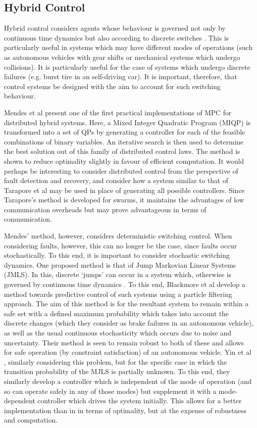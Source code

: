 \documentclass[../sample.tex]{subfiles}
\begin{document}
\subsection{Hybrid Control}

Hybrid control considers agents whose behaviour is governed not only by continuous time dynamics but
also according to discrete switches \cite{Lygeros2004}. This is particularly useful in systems
which may have different modes of operations (such as autonomous vehicles with gear shifts or
mechanical systems which undergo collisions). It is particularly useful for the case of systems
which undergo discrete failures (e.g. burst tire in an self-driving car). It is important,
therefore, that control systems be designed with the aim to account for such switching behaviour. 

Mendes et al \cite{Mendes2017} present one of the first practical implementations of MPC for
distributed hybrid systems. Here, a Mixed Integer Quadratic Program (MIQP) is transformed into a set
of QPs by generating a controller for each of the feasible combinations of binary variables. An
iterative search is then used to determine the best solution out of this family of distributed
control laws. The method is shown to reduce optimality slightly in favour of efficient computation.
It would perhaps be interesting to consider distributed control from the perspective of fault
detection and recovery, and consider how a system similar to that of Tarapore et al may be used in
place of generating all possible controllers. Since Tarapore’s method is developed for swarms, it
maintains the advantages of low communication overheads but may prove advantageous in terms of
communication.

Mendes’ method, however, considers deterministic switching control. When considering faults,
however, this can no longer be the case, since faults occur stochastically. To this end, it is
important to consider stochastic switching dynamics. One proposed method is that of Jump Markovian
Linear Systems (JMLS). In this, discrete ‘jumps’ can occur in a system which, otherwise is governed
by continuous time dynamics \cite{Ma2017}. To this end, Blackmore et al \cite{Blackmore2007} develop
a method towards predictive control of such systems using a particle filtering approach. The aim of
this method is for the resultant system to remain within a safe set with a defined maximum
probability which takes into account the discrete changes (which they consider as brake failures in
an autonomous vehicle), as well as the usual continuous stochasticity which occurs due to noise and
uncertainty. Their method is seen to remain robust to both of these and allows for safe operation
(by constraint satisfaction) of an autonomous vehicle. Yin et al \cite{Yin2014}, similarly
considering this problem, but for the specific case in which the transition probability of the MJLS
is partially unknown. To this end, they similarly develop a controller which is independent of the
mode of operation (and so can operate safely in any of those modes) but supplement it with a
mode-dependent controller which drives the system initially. This allows for a better implementation
than in \cite{Blackmore2007} in terms of optimality, but at the expense of robustness and
computation. 
\end{document}
